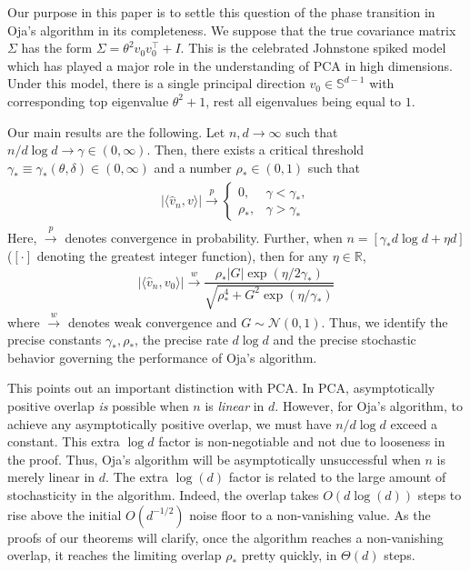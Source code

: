 \documentclass[12pt]{article}
\def\gN{{\mathcal{N}}}
\def\sR{{\mathbb{R}}}
\def\sS{{\mathbb{S}}}
\begin{document}
\medskip

Our purpose in this paper is to settle this question of the phase transition in Oja's algorithm in its completeness. We suppose that the true covariance matrix $\Sigma$ has the form $\Sigma=\theta^2v_0v_0^\top + I$. This is the celebrated Johnstone spiked model \citep{johnstone2001distribution} which has played a major role in the understanding of PCA in high dimensions. Under this model, there is a single principal direction $v_0\in\sS^{d-1}$ with corresponding top eigenvalue $\theta^2+1$, rest all eigenvalues being equal to $1$.

\medskip

Our main results are the following. Let $n,d\to\infty$ such that $n/d\log d\to\gamma\in(0,\infty)$. Then, there exists a critical threshold $\gamma_*\equiv \gamma_*(\theta,\delta)\in(0,\infty)$ and a number $\rho_*\in(0,1)$ such that
\begin{align}
\begin{split}
    |\langle\hat v_n,v\rangle| \stackrel{p}{\to} \begin{cases}
        0, & \gamma < \gamma_*,\\
        \rho_*, & \gamma > \gamma_*
    \end{cases}
\end{split}
\end{align}Here, $\stackrel{p}{\to}$ denotes convergence in probability. Further, when $n=[\gamma_*d\log d+\eta d]$ ($[\cdot]$ denoting the greatest integer function), then for any $\eta\in\sR$,
\begin{align}
    |\langle \hat v_n,v_0\rangle|\stackrel{w}{\to}\dfrac{\rho_*|G|\exp(\eta/2\gamma_*)}{\sqrt{\rho_*^4 + G^2\exp(\eta/\gamma_*)}}
\end{align}where $\stackrel{w}{\to}$ denotes weak convergence and $G\sim\gN(0,1)$. Thus, we identify the precise constants $\gamma_*,\rho_*$, the precise rate $d\log d$ and the precise stochastic behavior governing the performance of Oja's algorithm.

 \medskip

This points out an important distinction with PCA. In PCA, asymptotically positive overlap \textit{is} possible when $n$ is \textit{linear} in $d$. However, for Oja's algorithm, to achieve any asymptotically positive overlap, we must have $n/d\log d$ exceed a constant. This extra $\log d$ factor is non-negotiable and not due to looseness in the proof. Thus, Oja's algorithm will be asymptotically unsuccessful when $n$ is merely linear in $d$. The extra $\log(d)$ factor is related to the large amount of stochasticity in the algorithm. Indeed, the overlap takes $O(d\log(d))$ steps to rise above the initial $O(d^{-1/2})$ noise floor to a non-vanishing value. As the proofs of our theorems will clarify, once the algorithm reaches a non-vanishing overlap, it reaches the limiting overlap $\rho_*$ pretty quickly, in $\Theta(d)$ steps.
\end{document}

